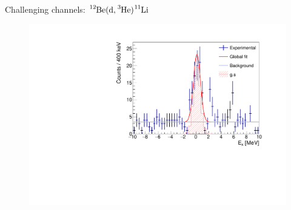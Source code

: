 \documentclass[sans,
frameno, %
mp,
usenames,dvipsnames, %
onlytextwidth, %
t,%
11pt]{beamer}
\newcommand{\iso}[2]{\ce{^{#1}#2}}
\begin{document}
\begin{frame}{Challenging channels: $\iso{12}{Be}(\textrm{d}, \iso{3}{He})\iso{11}{Li}$}
    \begin{figure}
        \begin{minipage}[t]{0.48\linewidth}
            \includegraphics[width=\textwidth]{figures/Workshop/12Be_d3He_ex.pdf}
        \end{minipage}
        \hfill
        \begin{minipage}[t]{0.48\linewidth}
            \centering


\end{minipage}
\end{figure}
\end{frame}
\end{document}
